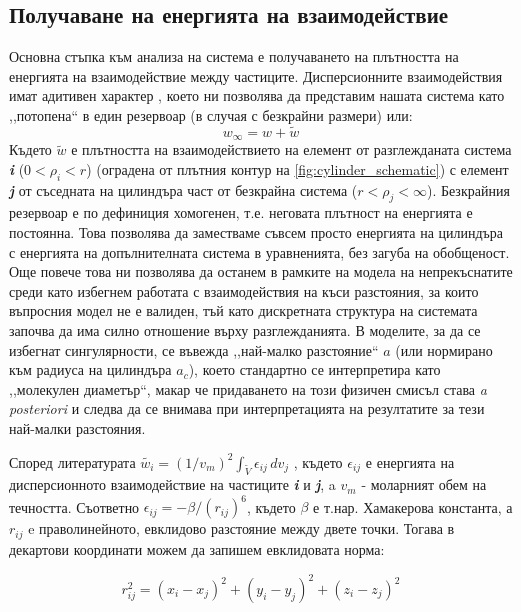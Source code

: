 \subsection{Получаване на енергията на взаимодействие}
Основна стъпка към анализа на система е получаването на плътността на енергията на взаимодействие между частиците. 
Дисперсионните взаимодействия имат адитивен характер \cite{israelachvili}, което ни позволява да представим нашата система като
,,потопена`` в един резервоар (в случая с безкрайни размери) или:
\begin{equation}
    w_{\infty}  = w + \tilde{w}
\end{equation}
Където $\tilde{w}$ е плътността на взаимодействието на елемент от разглежданата система \textbf{\textit{i}} ($0 < \rho_{i} < r$) (оградена от плътния контур на \autoref{fig:cylinder_schematic}) с елемент \textbf{\textit{j}} от съседната на цилиндъра част от безкрайна система ($r < \rho_{j} <  \infty$).
Безкрайния резервоар е по дефиниция хомогенен, т.е. неговата плътност на енергията е постоянна. Това позволява да заместваме съвсем просто енергията на цилиндъра с енергията на допълнителната система в уравненията, без загуба на обобщеност.
Още повече това ни позволява да останем в рамките на модела на непрекъснатите среди като избегнем работата с взаимодействия на къси разстояния, за които въпросния модел не е валиден, тъй като дискретната структура на системата започва да има силно отношение върху разглежданията.
В моделите, за да се избегнат сингулярности, се въвежда ,,най-малко разстояние`` $a$ (или нормирано към радиуса на цилиндъра $a_{c}$),
което стандартно се интерпретира като ,,молекулен диаметър``, макар че придаването на този физичен смисъл става \textit{a posteriori} \cite{israelachvili} и следва да се внимава 
при интерпретацията на резултатите за тези най-малки разстояния.


Според литературата  $\tilde{w_{i}} = (1/v_{m})^2 \int_{\tilde{V}}\epsilon_{ij}\,dv_{j}$ \cite{israelachvili}, където $\epsilon_{ij}$ е енергията на дисперсионното взаимодействие на частиците \textbf{\textit{i}} и \textbf{\textit{j}}, a $v_{m}$ - моларният обем на течността.
Съответно $\epsilon_{ij} = -\beta/(r_{ij})^6$, където $\beta$ е т.нар. Хамакерова константа, а $r_{ij}$ e праволинейното, евклидово разстояние между двете точки.
Тогава в декартови координати можем да запишем евклидовата норма:

\begin{equation}
    r_{ij}^2 = (x_{i} - x_{j})^2  + (y_{i} - y_{j})^2 + (z_{i}-z_{j})^2
    \label{eq:cartesian}
\end{equation}

